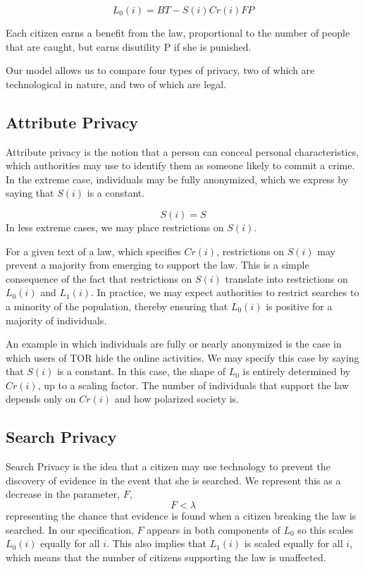 $$L_0(i) = BT - S(i)Cr(i)FP$$

Each citizen earns a benefit from the law, proportional to the number of people that are caught, but earns disutility P if she is punished.

Our model allows us to compare four types of privacy, two of which are technological in nature, and two of which are legal.

\subsection{Attribute Privacy}

Attribute privacy is the notion that a person can conceal personal characteristics, which authorities may use to identify them as someone likely to commit a crime.  In the extreme case, individuals may be fully anonymized, which we express by saying that $S(i)$ is a constant. 

$$S(i)=S$$ In less extreme cases, we may place restrictions on $S(i)$.

For a given text of a law, which specifies $Cr(i)$, restrictions on $S(i)$ may prevent a majority from emerging to support the law.  This is a simple consequence of the fact that restrictions on $S(i)$ translate into restrictions on $L_0(i)$ and $L_1(i)$.  In practice, we may expect authorities to restrict searches to a minority of the population, thereby ensuring that $L_0(i)$ is positive for a majority of individuals.

An example in which individuals are fully or nearly anonymized is the case in which users of TOR hide the online activities.  We may specify this case by saying that $S(i)$ is a constant.  In this case, the shape of $L_0$ is entirely determined by $Cr(i)$, up to a scaling factor.  The number of individuals that support the law depends only on $Cr(i)$ and how polarized society is.

\subsection{Search Privacy}

Search Privacy is the idea that a citizen may use technology to prevent the discovery of evidence in the event that she is searched.  We represent this as a decrease in the parameter, $F$, 
$$F<\lambda$$
representing the chance that evidence is found when a citizen breaking the law is searched.  In our specification, $F$ appears in both components of $L_0$ so this scales $L_0(i)$ equally for all $i$.  This also implies that $L_1(i)$ is scaled equally for all $i$, which means that the number of citizens supporting the law is unaffected.

